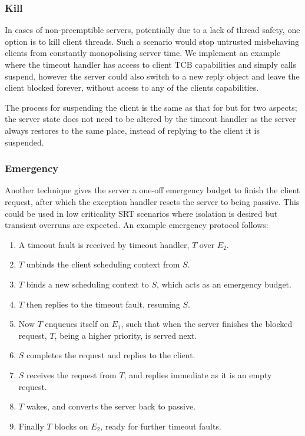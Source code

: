 \subsubsection{Kill}

In cases of non-preemptible servers, potentially due to a lack of thread safety, one option is to
kill client threads. Such a scenario would stop untrusted misbehaving clients from constantly
monopolising server time.  We implement an example where the timeout handler has access to client \gls{TCB}
capabilities and simply calls suspend, however the server could also switch to a new reply object
and leave the client blocked forever, without access to any of the clients capabilities. 

The process for suspending the client is the same as that for  but for two aspects;
the server state does not need to be altered by the timeout handler as the server always 
restores to the same place, instead of replying to the client it is suspended.

\subsubsection{Emergency}

Another technique gives the server a one-off emergency budget to finish the client request, after
which the exception handler resets the server to being passive. This could be used in low
criticality \gls{SRT}
scenarios where isolation is desired but transient overruns are expected.
An example emergency protocol follows:

\begin{enumerate}\label{e:emergency}
    \item A timeout fault is received by timeout handler, $T$ over $E_{2}$.
    \item $T$ unbinds the client scheduling context from $S$.
    \item $T$ binds a new scheduling context to $S$, which acts as an emergency budget.
    \item $T$ then replies to the timeout fault, resuming $S$.
    \item Now $T$ enqueues itself on $E_{1}$, such that when the server finishes the blocked request,
        $T$, being a higher priority, is served next.
    \item $S$ completes the request and replies to the client.
    \item $S$ receives the request from $T$, and replies immediate as it is an empty request.
    \item $T$ wakes, and converts the server back to passive.
    \item Finally $T$ blocks on $E_{2}$, ready for further timeout faults.
\end{enumerate}

